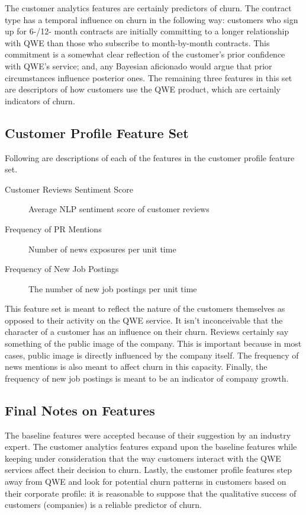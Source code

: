 \documentclass{article}
\begin{document}
	The customer analytics features are certainly predictors of churn. The contract type has a temporal influence on churn in the following way: customers who sign up for 6-/12- month contracts are initially committing to a longer relationship with QWE than those who subscribe to month-by-month contracts. This commitment is a somewhat clear reflection of the customer's prior confidence with QWE's service; and, any Bayesian aficionado would argue that prior circumstances influence posterior ones. The remaining three features in this set are descriptors of how customers use the QWE product, which are certainly indicators of churn.

	\subsection{Customer Profile Feature Set}
	
	Following are descriptions of each of the features in the customer profile feature set.
	
	\begin{description}
		\item[Customer Reviews Sentiment Score] Average NLP sentiment score of customer reviews
		\item[Frequency of PR Mentions] Number of news exposures per unit time
		\item[Frequency of New Job Postings] The number of new job postings per unit time
	\end{description}

	This feature set is meant to reflect the nature of the customers themselves as opposed to their activity on the QWE service. It isn't inconceivable that the character of a customer has an influence on their churn. Reviews certainly say something of the public image of the company. This is important because in most cases, public image is directly influenced by the company itself. The frequency of news mentions is also meant to affect churn in this capacity. Finally, the frequency of new job postings is meant to be an indicator of company growth.

	\subsection{Final Notes on Features}
	
	The baseline features were accepted because of their suggestion by an industry expert. The customer analytics features expand upon the baseline features while keeping under consideration that the way customers interact with the QWE services affect their decision to churn. Lastly, the customer profile features step away from QWE and look for potential churn patterns in customers based on their corporate profile: it is reasonable to suppose that the qualitative success of customers (companies) is a reliable predictor of churn.
	
\end{document}
